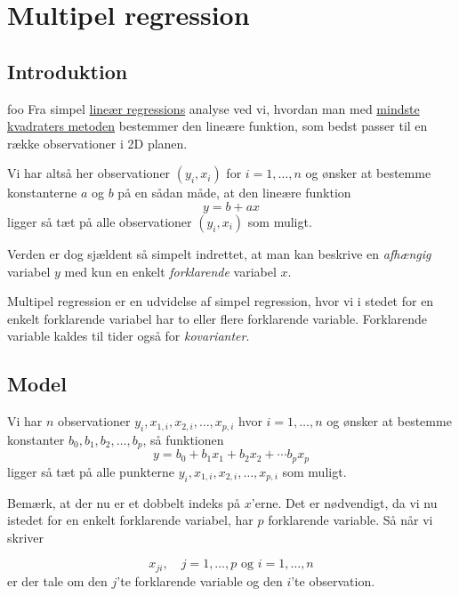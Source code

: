 
\section{Multipel regression}

\subsection{Introduktion}
foo
Fra simpel \href{http://www.webmatematik.dk/lektioner/matematik-b/regression}{lineær
regressions} analyse ved vi, hvordan man med
\href{http://www.webmatematik.dk/lektioner/matematik-b/regression}{mindste kvadraters metoden}
bestemmer den lineære funktion, som bedst passer til en række observationer i 2D planen.

Vi har altså her observationer \((y_i, x_i)\) for \(i=1,\ldots,n\) og ønsker at bestemme konstanterne \(a\) og \(b\) på en sådan måde, at den lineære funktion
\begin{displaymath}
  y = b + a x
\end{displaymath}
ligger så tæt på alle observationer \((y_i, x_i)\) som muligt.

Verden er dog sjældent så simpelt indrettet, at man kan beskrive en \textit{afhængig} variabel \(y\)
med kun en enkelt \textit{forklarende} variabel \(x\).

Multipel regression er en udvidelse af simpel regression, hvor vi i stedet for en enkelt forklarende
variabel har to eller flere forklarende variable. For\-kla\-ren\-de variable kaldes til tider også for \textit{kovarianter}.

\subsection{Model}
Vi har \(n\) observationer \(y_i,x_{1,i},x_{2,i},\ldots,x_{p,i}\) hvor \(i=1,\ldots,n\) og ønsker at bestemme konstanter \(b_0,b_1,b_2,\ldots,b_p\), så funktionen
\begin{displaymath}
  y = b_0 + b_1 x_1 + b_2 x_2 + \cdots b_p x_p
\end{displaymath}
ligger så tæt på alle punkterne \(y_i,x_{1,i},x_{2,i},\ldots,x_{p,i}\) som muligt.

Bemærk, at der nu er et dobbelt indeks på \(x\)'erne. Det er nødvendigt, da vi nu istedet for en enkelt forklarende variabel, har \(p\) forklarende variable. Så når vi skriver

\begin{displaymath}
  x_{ji}, \quad j=1,\ldots,p \textrm{ og } i=1,\ldots,n
\end{displaymath}
er der tale om den \(j\)'te forklarende variable og den \(i\)'te observation.


